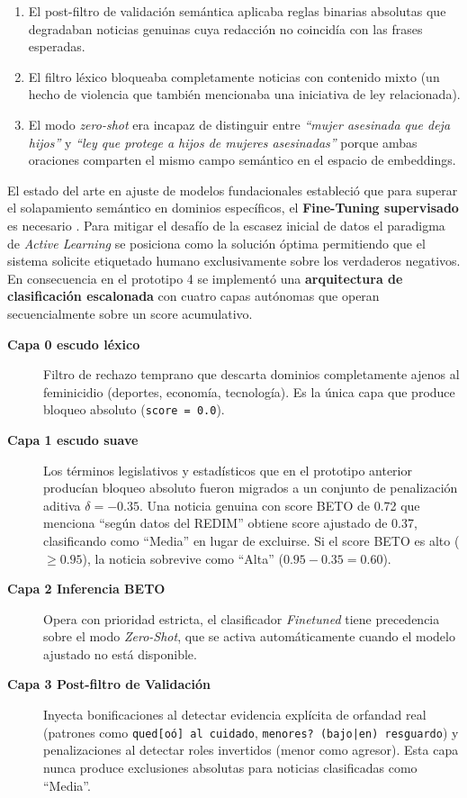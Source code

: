 \begin{enumerate}
    \item El post-filtro de validación semántica aplicaba reglas binarias absolutas que degradaban
          noticias genuinas cuya redacción no coincidía con las frases esperadas.
    \item El filtro léxico bloqueaba completamente noticias con contenido mixto (un hecho de
          violencia que también mencionaba una iniciativa de ley relacionada).
    \item El modo \textit{zero-shot} era incapaz de distinguir entre \textit{``mujer asesinada que
          deja hijos''} y \textit{``ley que protege a hijos de mujeres asesinadas''} porque
          ambas oraciones comparten el mismo campo semántico en el espacio de embeddings.
\end{enumerate}

El estado del arte en ajuste de modelos fundacionales estableció que para superar el solapamiento
semántico en dominios específicos, el \textbf{Fine-Tuning supervisado} es necesario
\cite{peters2019tune}. Para mitigar el desafío de la escasez inicial de datos el paradigma de
\textit{Active Learning} \cite{settles2009active} se posiciona como la solución óptima permitiendo
que el sistema solicite etiquetado humano exclusivamente sobre los verdaderos negativos.
En consecuencia en el prototipo 4 se implementó una \textbf{arquitectura de clasificación escalonada}
con cuatro capas autónomas que operan secuencialmente sobre un score acumulativo.

\begin{description}
    \item[\textbf{Capa 0 escudo léxico}] Filtro de rechazo temprano que descarta dominios completamente
    ajenos al feminicidio (deportes, economía, tecnología). Es la única capa que produce bloqueo absoluto
    (\texttt{score = 0.0}).

    \item[\textbf{Capa 1 escudo suave}] Los términos legislativos y estadísticos que en el
    prototipo anterior producían bloqueo absoluto fueron migrados a un conjunto de penalización
    aditiva $\delta = -0.35$. Una noticia genuina con score BETO de 0.72 que menciona
    ``según datos del REDIM'' obtiene score ajustado de 0.37, clasificando como ``Media''
    en lugar de excluirse. Si el score BETO es alto ($\geq 0.95$), la noticia sobrevive
    como ``Alta'' ($0.95 - 0.35 = 0.60$).

    \item[\textbf{Capa 2 Inferencia BETO}] Opera con prioridad estricta, el clasificador
    \textit{Finetuned} tiene precedencia sobre el modo \textit{Zero-Shot}, que se activa
    automáticamente cuando el modelo ajustado no está disponible.

    \item[\textbf{Capa 3 Post-filtro de Validación}] Inyecta bonificaciones al detectar
    evidencia explícita de orfandad real (patrones como \texttt{qued[oó] al cuidado},
    \texttt{menores? (bajo|en) resguardo}) y penalizaciones al detectar roles invertidos
    (menor como agresor). Esta capa nunca produce exclusiones absolutas para noticias
    clasificadas como ``Media''.
\end{description}

